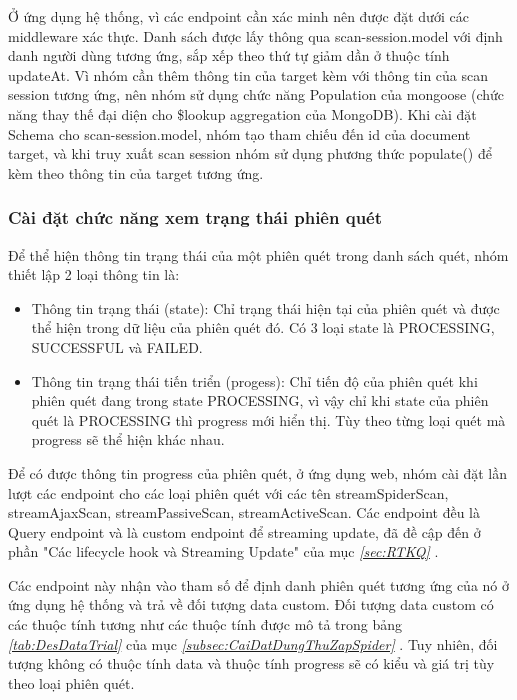 Ở ứng dụng hệ thống, vì các endpoint cần xác minh nên được đặt dưới các middleware xác thực. Danh sách được lấy thông qua scan-session.model với định danh người dùng tương ứng, sắp xếp theo thứ tự giảm dần ở thuộc tính updateAt. Vì nhóm cần thêm thông tin của target kèm với thông tin của scan session tương ứng, nên nhóm sử dụng chức năng Population của mongoose (chức năng thay thế đại diện cho \$lookup aggregation của MongoDB). Khi cài đặt Schema cho scan-session.model, nhóm tạo tham chiếu đến id của document target, và khi truy xuất scan session nhóm sử dụng phương thức populate() để kèm theo thông tin của target tương ứng.

\subsubsection{Cài đặt chức năng xem trạng thái phiên quét} \label{subsubsec:CaiDatXemTrangThaiPhienQuet}

\tab Để thể hiện thông tin trạng thái của một phiên quét trong danh sách quét, nhóm thiết lập 2 loại thông tin là:

\begin{itemize}
  \item Thông tin trạng thái (state): Chỉ trạng thái hiện tại của phiên quét và được thể hiện trong dữ liệu của phiên quét đó.
  Có 3 loại state là PROCESSING, SUCCESSFUL và FAILED.
  \item Thông tin trạng thái tiến triển (progess): Chỉ tiến độ của phiên quét khi phiên quét đang trong state PROCESSING, vì vậy chỉ khi state của phiên quét là PROCESSING thì progress mới hiển thị.
  Tùy theo từng loại quét mà progress sẽ thể hiện khác nhau.
\end{itemize}

Để có được thông tin progress của phiên quét, ở ứng dụng web, nhóm cài đặt lần lượt các endpoint cho các loại phiên quét với các tên streamSpiderScan, streamAjaxScan, streamPassiveScan, streamActiveScan.
Các endpoint đều là Query endpoint và là custom endpoint để streaming update, đã đề cập đến ở phần "Các lifecycle hook và Streaming Update" của mục \textit{\ref{sec:RTKQ} }.

Các endpoint này nhận vào tham số để định danh phiên quét tương ứng của nó ở ứng dụng hệ thống và trả về đối tượng data custom.
Đối tượng data custom có các thuộc tính tương như các thuộc tính được mô tả trong bảng \textit{\ref{tab:DesDataTrial} } của mục \textit{\ref{subsec:CaiDatDungThuZapSpider} }.
Tuy nhiên, đối tượng không có thuộc tính data và thuộc tính progress sẽ có kiểu và giá trị tùy theo loại phiên quét.

